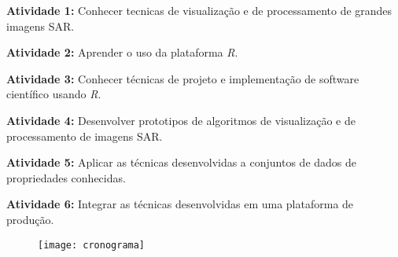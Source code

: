 \documentclass[12pt,letterpaper]{article}
\begin{document}
\textbf{Atividade 1:} Conhecer tecnicas de visualização e de processamento de grandes imagens SAR.

\textbf{Atividade 2:} Aprender o uso da plataforma \textit{R}.

\textbf{Atividade 3:} Conhecer técnicas de projeto e implementação de software científico usando \textit{R}.

\textbf{Atividade 4:} Desenvolver prototipos de algoritmos de visualização e de processamento de imagens SAR.

\textbf{Atividade 5:} Aplicar as técnicas desenvolvidas a conjuntos de dados de propriedades conhecidas.

\textbf{Atividade 6:} Integrar as técnicas desenvolvidas em uma plataforma de produção.\\

\begin{figure}[H]
\begin{center}
\texttt{[image: cronograma]}
\end{center}
\end{figure}
\end{document}
